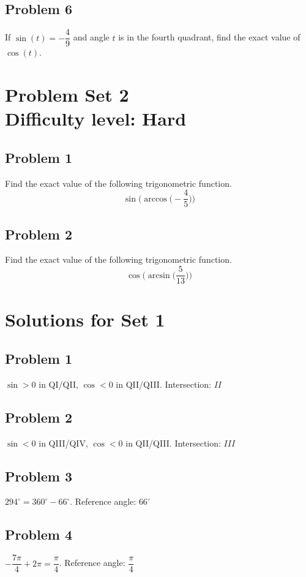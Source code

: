 \documentclass[12pt]{article}
\begin{document}
\subsection*{Problem 6}
If \(\sin(t)=-\dfrac{4}{9}\) and angle \(t\) is in the fourth quadrant, find the exact value of \(\cos(t)\).\\

\section*{Problem Set 2\\Difficulty level: Hard}
\subsection*{Problem 1}
Find the exact value of the following trigonometric function.
\[\sin\Big(\arccos\Big(-\dfrac{4}{5}\Big)\Big)\]

\subsection*{Problem 2}
Find the exact value of the following trigonometric function.
\[\cos\Big(\arcsin\Big(\dfrac{5}{13}\Big)\Big)\]

\newpage
\section*{Solutions for Set 1}
\subsection*{Problem 1}
\(\sin>0\) in QI/QII, \(\cos<0\) in QII/QIII. Intersection: \(\boxed{II}\)

\subsection*{Problem 2}
\(\sin<0\) in QIII/QIV, \(\cos<0\) in QII/QIII. Intersection: \(\boxed{III}\)

\subsection*{Problem 3}
\(294^\circ = 360^\circ - 66^\circ\). Reference angle: \(\boxed{66^\circ}\)

\subsection*{Problem 4}
\(-\dfrac{7\pi}{4} + 2\pi = \dfrac{\pi}{4}\). Reference angle: \(\boxed{\dfrac{\pi}{4}}\)
\end{document}
